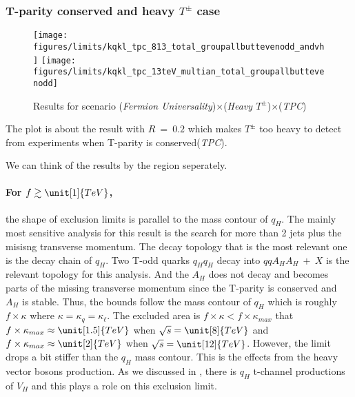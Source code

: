 \subsubsection{T-parity conserved and heavy $T^\pm$ case}

\begin{figure*}[h]
\centering
\texttt{[image: figures/limits/kqkl\_tpc\_813\_total\_groupallbuttevenodd\_andvh]} 
\texttt{[image: figures/limits/kqkl\_tpc\_13teV\_multian\_total\_groupallbuttevenodd]}
\caption{Results for scenario (\emph{Fermion Universality})$\times$(\emph{Heavy $T^\pm$})$\times$(\emph{TPC})}
\label{fig:cmresults:univtpcnotop}
\end{figure*}

The plot  is about the result with $R~=~0.2$ which makes $T^\pm$ too heavy to detect from experiments
when T-parity is conserved(\emph{TPC}). 

We can think of the results by the region seperately. 
\paragraph{For $f \gtrsim \unit[1]{TeV} $,} the shape of exclusion limits is parallel to the mass contour of $q_H$. 
The mainly most sensitive analysis for this result is the search for more than 2 jets plus the misisng transverse momentum. 
The decay topology that is the most relevant one is the decay chain of $q_H$.  %
 Two T-odd quarks $q_H q_H$ decay into $qqA_HA_H~+~X$ is the relevant topology for this analysis. 
And the $A_H$ does not decay and becomes parts of the missing transverse momentum since the T-parity is conserved and $A_H$ is stable.
Thus, the bounds follow the mass contour of $q_H$ which is roughly $f\times \kappa$ where $\kappa=\kappa_q=\kappa_\ell$.
The excluded area is $f\times \kappa < f\times \kappa_{max}$ that $f\times \kappa_{max} \approx \unit[1.5]{TeV}$  when $\sqrt{s}=\unit[8]{TeV}$ 
and $f\times \kappa_{max} \approx \unit[2]{TeV}$  when $\sqrt{s}=\unit[12]{TeV}$. 
However, the limit drops a bit stiffer than the $q_H$ mass contour.
This is the effects from the heavy vector bosons production. 
As we discussed in , there is $q_H$ t-channel productions of $V_H$ and 
this plays a role on this exclusion limit. 


